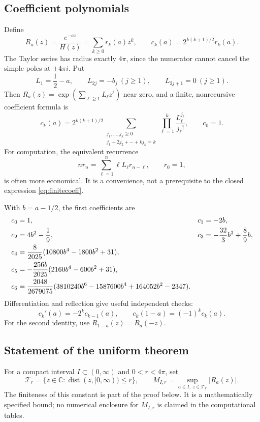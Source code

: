\documentclass[11pt,letterpaper]{article}
\numberwithin{equation}{section}
\theoremstyle{definition}
\theoremstyle{remark}
\newcommand{\C}{\mathbb C}
\DeclareMathOperator{\dist}{dist}
\begin{document}
\subsection{Coefficient polynomials}
Define
\begin{equation}\label{eq:Rdef}
 R_a(z)=\frac{e^{-az}}{H(z)}=\sum_{k\ge0}r_k(a)z^k,
 \qquad c_k(a)=2^{k(k+1)/2}r_k(a).
\end{equation}
The Taylor series has radius exactly $4\pi$, since the numerator cannot
cancel the simple poles at $\pm4\pi i$.
Put
\begin{equation}\label{eq:ellcoeffs}
 L_1=\frac12-a,\qquad L_{2j}=-b_j\ (j\ge1),\qquad
 L_{2j+1}=0\ (j\ge1).
\end{equation}
Then $R_a(z)=\exp(\sum_{\ell\ge1}L_\ell z^\ell)$ near zero, and a finite,
nonrecursive coefficient formula is
\begin{equation}\label{eq:finitecoeff}
 c_k(a)=2^{k(k+1)/2}
 \sum_{\substack{j_1,\ldots,j_k\ge0\\
                  j_1+2j_2+\cdots+kj_k=k}}
 \prod_{\ell=1}^k\frac{L_\ell^{j_\ell}}{j_\ell!},
 \qquad c_0=1.
\end{equation}
For computation, the equivalent recurrence
\begin{equation}\label{eq:coeffrec}
 n r_n=\sum_{\ell=1}^n\ell L_\ell r_{n-\ell},\qquad r_0=1,
\end{equation}
is often more economical. It is a convenience, not a prerequisite to the
closed expression \eqref{eq:finitecoeff}.

With $b=a-1/2$, the first coefficients are
\begin{align}
 c_0&=1,& c_1&=-2b,\notag\\
 c_2&=4b^2-\frac19,&
 c_3&=-\frac{32}{3}b^3+\frac89b,\label{eq:firstcoeff}\\
 c_4&=\frac8{2025}(10800b^4-1800b^2+31),\notag\\
 c_5&=-\frac{256b}{2025}(2160b^4-600b^2+31),\notag\\
 c_6&=\frac{2048}{2679075}
       (3810240b^6-1587600b^4+164052b^2-2347).\notag
\end{align}
Differentiation and reflection give useful independent checks:
\begin{equation}\label{eq:coeffchecks}
 c_k'(a)=-2^k c_{k-1}(a),\qquad
 c_k(1-a)=(-1)^k c_k(a).
\end{equation}
For the second identity, use $R_{1-a}(z)=R_a(-z)$.

\subsection{Statement of the uniform theorem}
For a compact interval $I\subset(0,\infty)$ and $0<r<4\pi$, set
\begin{equation}\label{eq:tube}
 \mathcal T_r=\{z\in\C:\dist(z,[0,\infty))\le r\},\qquad
 M_{I,r}=\sup_{a\in I,\ z\in\mathcal T_r}|R_a(z)|.
\end{equation}
The finiteness of this constant is part of the proof below.
It is a mathematically specified bound; no numerical enclosure for
$M_{I,r}$ is claimed in the computational tables.
\end{document}
